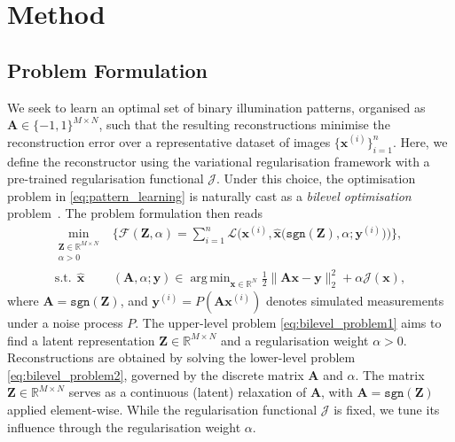 \documentclass[lettersize,journal]{IEEEtran}
\providecommand{\BA}{{\mathbf A}}
\providecommand{\BZ}{{\mathbf Z}}
\providecommand{\Bx}{{\mathbf x}}
\providecommand{\By}{{\mathbf y}}
\DeclareMathOperator*{\argmin}{arg\,min}
\begin{document}
\section{Method}
\label{sec:method}

\subsection{Problem Formulation}
We seek to learn an optimal set of binary illumination patterns, organised as  $\BA \in \{-1,1\}^{M \times N}$, such that the resulting reconstructions minimise the reconstruction error over a representative dataset of images $\{ \Bx^{(i)} \}_{i=1}^n$.
Here, we define the reconstructor using the variational regularisation framework with a pre-trained regularisation functional $\mathcal{J}$.
Under this choice, the optimisation problem in \eqref{eq:pattern_learning} is naturally cast as a \emph{bilevel optimisation} problem~\cite{Colson_2007_OverviewBilevelOptimization}. 
The problem formulation then reads
\begin{align}
\label{eq:bilevel_problem1}
    \min_{\substack{\BZ \in \mathbb{R}^{M \times N}\\ \alpha >0}} &\!\bigg\{ \mathcal{F}(\BZ,\!\alpha)\!=\!\sum_{i=1}^n \mathcal{L}\Big(\Bx^{(i)},\!\hat{\Bx}\big(\texttt{sgn}(\BZ), \alpha;\By^{(i)}\big)\Big) \bigg\},\\ 
\label{eq:bilevel_problem2}
    \text{s.t.}\ \ \hat{\Bx}&(\BA, \alpha;\By) \in \argmin_{\Bx\in \mathbb{R}^N} \frac{1}{2} \| \BA \Bx - \By \|_2^2 + \alpha  \mathcal{J}(\Bx),
\end{align}
where $\BA = \texttt{sgn}(\BZ)$, and $\By^{(i)} = P(\BA \Bx^{(i)})$ denotes simulated measurements under a noise process $P$. 
The upper-level problem \eqref{eq:bilevel_problem1} aims to find a latent representation $\BZ\in\mathbb{R}^{M\times N}$ and a regularisation weight $\alpha>0$. 
Reconstructions are obtained by solving the lower-level problem \eqref{eq:bilevel_problem2}, governed by the discrete matrix $\BA$ and $\alpha$.  
The matrix $\BZ \in \mathbb{R}^{M \times N}$ serves as a continuous (latent) relaxation of $\BA$, with $\BA = \texttt{sgn}(\BZ)$ applied element-wise. 
While the regularisation functional $\mathcal{J}$ is fixed, we tune its influence through the regularisation weight $\alpha$. 
 
\end{document}
